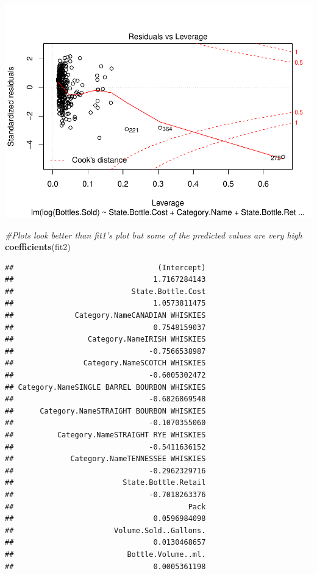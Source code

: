 \documentclass[]{elsarticle} %
\makeatletter
\newenvironment{Shaded}{\begin{snugshade}}{\end{snugshade}}
\newcommand{\KeywordTok}[1]{\textcolor[rgb]{0.13,0.29,0.53}{\textbf{{#1}}}}
\newcommand{\CommentTok}[1]{\textcolor[rgb]{0.56,0.35,0.01}{\textit{{#1}}}}
\newcommand{\NormalTok}[1]{{#1}}
\def\maxwidth{\ifdim\Gin@nat@width>\linewidth\linewidth
\else\Gin@nat@width\fi}
\let\Oldincludegraphics\includegraphics
\renewcommand{\includegraphics}[1]{\Oldincludegraphics[width=\maxwidth]{#1}}
\makeatother
\begin{document}
\includegraphics{Final_Project_files/figure-latex/unnamed-chunk-14-6.pdf}

\begin{Shaded}
\begin{Highlighting}[]
\CommentTok{#Plots look better than fit1's plot but some of the predicted values are very high}
\KeywordTok{coefficients}\NormalTok{(fit2)}
\end{Highlighting}
\end{Shaded}

\begin{verbatim}
##                                 (Intercept) 
##                                1.7167284143 
##                           State.Bottle.Cost 
##                                1.0573811475 
##              Category.NameCANADIAN WHISKIES 
##                                0.7548159037 
##                 Category.NameIRISH WHISKIES 
##                               -0.7566538987 
##                Category.NameSCOTCH WHISKIES 
##                               -0.6005302472 
## Category.NameSINGLE BARREL BOURBON WHISKIES 
##                               -0.6826869548 
##      Category.NameSTRAIGHT BOURBON WHISKIES 
##                               -0.1070355060 
##          Category.NameSTRAIGHT RYE WHISKIES 
##                               -0.5411636152 
##             Category.NameTENNESSEE WHISKIES 
##                               -0.2962329716 
##                         State.Bottle.Retail 
##                               -0.7018263376 
##                                        Pack 
##                                0.0596984098 
##                       Volume.Sold..Gallons. 
##                                0.0130468657 
##                          Bottle.Volume..ml. 
##                                0.0005361198
\end{verbatim}
\end{document}
